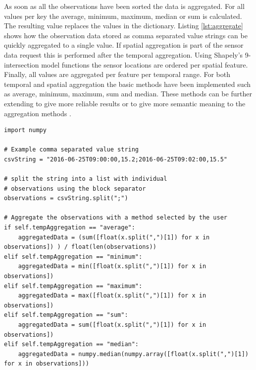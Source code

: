 As soon as all the observations have been sorted the data is aggregated. For all values per key the average, minimum, maximum, median or sum is calculated. The resulting value replaces the values in the dictionary. Listing \ref{lst:aggregate} shows how the observation data stored as comma separated value strings can be quickly aggregated to a single value. If spatial aggregation is part of the sensor data request this is performed after the temporal aggregation. Using Shapely's 9-intersection model functions the sensor locations are ordered per spatial feature. Finally, all values are aggregated per feature per temporal range. For both temporal and spatial aggregation the basic methods have been implemented such as average, minimum, maximum, sum and median. These methods can be further extending to give more reliable results \citep{SW:Ganesan} or to give more semantic meaning to the aggregation methods \citep{SSW:Stasch4}.         


\begin{lstlisting}[float,caption={Script that performs basic temporal aggregation methods on a comma separated value string}, label={lst:aggregate}]
import numpy

# Example comma separated value string 
csvString = "2016-06-25T09:00:00,15.2;2016-06-25T09:02:00,15.5"

# split the string into a list with individual 
# observations using the block separator 
observations = csvString.split(";")

# Aggregate the observations with a method selected by the user
if self.tempAggregation == "average":
	aggregatedData = (sum([float(x.split(",")[1]) for x in observations]) ) / float(len(observations))
elif self.tempAggregation == "minimum":
	aggregatedData = min([float(x.split(",")[1]) for x in observations])
elif self.tempAggregation == "maximum":
	aggregatedData = max([float(x.split(",")[1]) for x in observations])
elif self.tempAggregation == "sum":
	aggregatedData = sum([float(x.split(",")[1]) for x in observations])
elif self.tempAggregation == "median":
	aggregatedData = numpy.median(numpy.array([float(x.split(",")[1]) for x in observations]))
\end{lstlisting}


